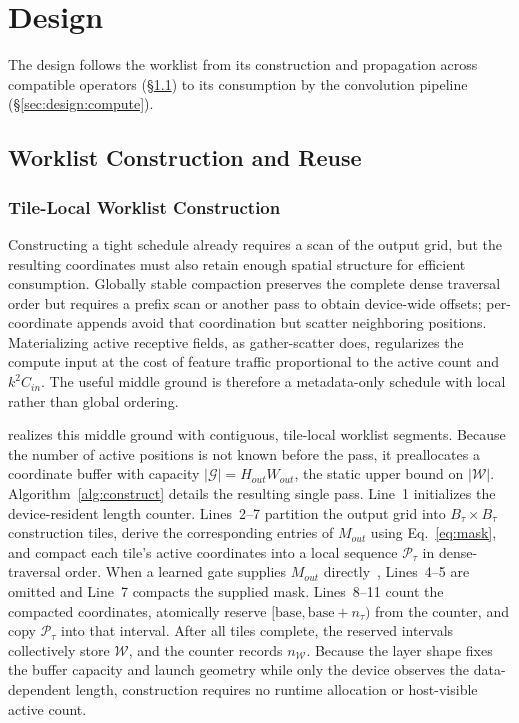 \section{\sysname Design}
\label{sec:design}

The design follows the worklist from its construction and propagation across
compatible operators (\S\ref{sec:design:construct}) to its consumption by the
convolution pipeline (\S\ref{sec:design:compute}).

\subsection{Worklist Construction and Reuse}
\label{sec:design:construct}

\subsubsection{Tile-Local Worklist Construction}
\label{sec:design:construct:compact}

Constructing a tight schedule already requires a scan of the output grid, but
the resulting coordinates must also retain enough spatial structure for
efficient consumption. Globally stable compaction preserves the complete dense
traversal order but requires a prefix scan or another pass to obtain
device-wide offsets; per-coordinate appends avoid that coordination but scatter
neighboring positions. Materializing active receptive fields, as gather-scatter
does, regularizes the compute input at the cost of feature traffic proportional
to the active count and $k^2C_{in}$. The useful middle ground is therefore a
metadata-only schedule with local rather than global ordering.

\sysname realizes this middle ground with contiguous, tile-local worklist
segments. Because the number of active positions is not known before the pass,
it preallocates a coordinate buffer with capacity
$|\mathcal{G}|=H_{out}W_{out}$, the static upper bound on
$|\mathcal{W}|$. Algorithm~\ref{alg:construct} details the resulting single
pass. Line~1 initializes the device-resident length counter. Lines~2--7
partition the output grid into $B_\tau\times B_\tau$ construction tiles, derive
the corresponding entries of $M_{out}$ using Eq.~\ref{eq:mask}, and compact
each tile's active coordinates into a local sequence $\mathcal{P}_\tau$ in
dense-traversal order. When a learned gate supplies $M_{out}$
directly~\cite{dynconv,dgnet}, Lines~4--5 are omitted and Line~7 compacts the
supplied mask. Lines~8--11 count the compacted coordinates, atomically reserve
$[\mathrm{base},\mathrm{base}+n_\tau)$ from the counter, and copy
$\mathcal{P}_\tau$ into that interval. After all tiles complete, the reserved
intervals collectively store $\mathcal{W}$, and the counter records
$n_{\mathcal{W}}$. Because the layer shape fixes the buffer capacity and launch
geometry while only the device observes the data-dependent length, construction
requires no runtime allocation or host-visible active count.


